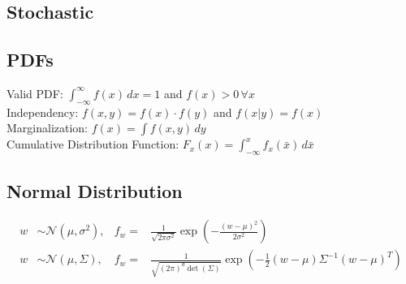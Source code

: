 \documentclass[landscape,a4paper,8pt]{scrartcl}
\begin{document}
\sffamily


\begin{multicols*}{3}
\section{Stochastic}
\subsection{PDFs}

Valid PDF: $\int_{-\infty}^{\infty} f(x)\, dx = 1$ and  $f(x) > 0\,  \forall x$ \\
Independency: $f(x,y) = f(x) \cdot f(y)$ and $f(x|y) = f(x)$ \\
Marginalization: $f(x) = \int f(x,y) \, dy$ \\
Cumulative Distribution Function: $F_x(x) = \int_{-\infty}^x f_x(\bar{x}) \, d\bar{x}$

%

\subsection{Normal Distribution}
\begin{align*}
w &\sim \mathcal{N}(\mu, \sigma^2), & f_w = & \frac{1}{\sqrt{2 \pi \sigma^2}} \exp\left( - \frac{(w-\mu)^2}{2\sigma^2} \right) \\
w &\sim \mathcal{N}(\mu, \Sigma), & f_w = & \frac{1}{\sqrt{(2 \pi)^d \det(\Sigma)}} \exp\left( -\frac{1}{2} (w-\mu)\Sigma^{-1} (w-\mu)^T \right)
\end{align*}


\end{multicols*}
\end{document}
